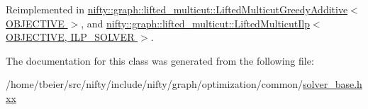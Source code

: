 Reimplemented in \hyperlink{classnifty_1_1graph_1_1lifted__multicut_1_1LiftedMulticutGreedyAdditive_aedc059129bc6c5e7fae87049693e03e6}{nifty\+::graph\+::lifted\+\_\+multicut\+::\+Lifted\+Multicut\+Greedy\+Additive$<$ O\+B\+J\+E\+C\+T\+I\+V\+E $>$}, and \hyperlink{classnifty_1_1graph_1_1lifted__multicut_1_1LiftedMulticutIlp_a3c1d526c0615ed8b1375044b1e30f4c1}{nifty\+::graph\+::lifted\+\_\+multicut\+::\+Lifted\+Multicut\+Ilp$<$ O\+B\+J\+E\+C\+T\+I\+V\+E, I\+L\+P\+\_\+\+S\+O\+L\+V\+E\+R $>$}.



The documentation for this class was generated from the following file\+:\begin{DoxyCompactItemize}
\item 
/home/tbeier/src/nifty/include/nifty/graph/optimization/common/\hyperlink{solver__base_8hxx}{solver\+\_\+base.\+hxx}\end{DoxyCompactItemize}
